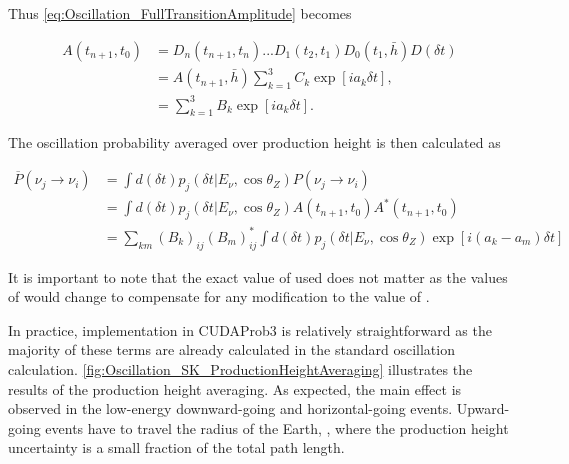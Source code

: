 Thus \autoref{eq:Oscillation_FullTransitionAmplitude} becomes

\begin{equation}
  \begin{split}
    A(t_{n+1},t_{0}) &= D_{n}(t_{n+1},t_{n})...D_{1}(t_{2},t_{1})D_{0}(t_{1},\bar{h})D(\delta t) \\
    &= A(t_{n+1},\bar{h}) \sum_{k=1}^{3} C_{k} \exp[ia_{k} \delta t], \\
    &= \sum_{k=1}^{3} B_{k} \exp[ia_{k} \delta t].
  \end{split}
\end{equation}

The oscillation probability averaged over production height is then calculated as

\begin{equation}
  \begin{split}
    \overline P(\nu_{j} \rightarrow \nu_{i}) &= \int d(\delta t) p_{j}(\delta t|E_{\nu}, \cos\theta_{Z}) P(\nu_{j} \rightarrow \nu_{i}) \\
    &= \int d(\delta t) p_{j}(\delta t|E_{\nu}, \cos\theta_{Z})	A(t_{n+1},t_{0}) A^{*}(t_{n+1},t_{0}) \\
    &= \sum_{km} (B_{k})_{ij} (B_{m})^{*}_{ij} \int d(\delta t) p_{j}(\delta t|E_{\nu}, \cos\theta_{Z}) \exp[i(a_{k}-a_{m})\delta t]
  \end{split}
\end{equation}

It is important to note that the exact value of  used does not matter as the values of  would change to compensate for any modification to the value of .

In practice, implementation in CUDAProb3 \cite{cudaprob3} is relatively straightforward as the majority of these terms are already calculated in the standard oscillation calculation. \autoref{fig:Oscillation_SK_ProductionHeightAveraging} illustrates the results of the production height averaging. As expected, the main effect is observed in the low-energy downward-going and horizontal-going events. Upward-going events have to travel the radius of the Earth, , where the production height uncertainty is a small fraction of the total path length. 

